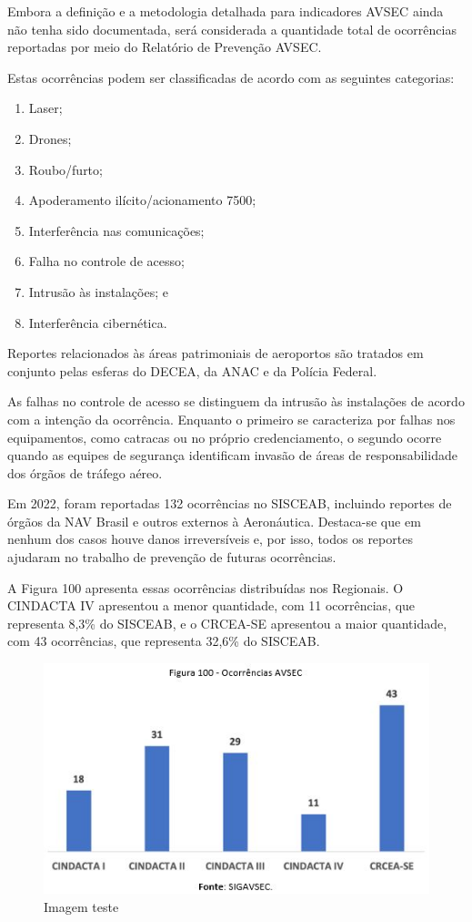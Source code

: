 \documentclass[
]{book}
\begin{document}
Embora a definição e a metodologia detalhada para indicadores AVSEC ainda não tenha sido documentada, será considerada a quantidade total de ocorrências reportadas por meio do Relatório de Prevenção AVSEC.

Estas ocorrências podem ser classificadas de acordo com as seguintes categorias:

\begin{enumerate}
\def\labelenumi{\alph{enumi})}
\item
  Laser;
\item
  Drones;
\item
  Roubo/furto;
\item
  Apoderamento ilícito/acionamento 7500;
\item
  Interferência nas comunicações;
\item
  Falha no controle de acesso;
\item
  Intrusão às instalações; e
\item
  Interferência cibernética.
\end{enumerate}

Reportes relacionados às áreas patrimoniais de aeroportos são tratados em conjunto pelas esferas do DECEA, da ANAC e da Polícia Federal.

As falhas no controle de acesso se distinguem da intrusão às instalações de acordo com a intenção da ocorrência. Enquanto o primeiro se caracteriza por falhas nos equipamentos, como catracas ou no próprio credenciamento, o segundo ocorre quando as equipes de segurança identificam invasão de áreas de responsabilidade dos órgãos de tráfego aéreo.

Em 2022, foram reportadas 132 ocorrências no SISCEAB, incluindo reportes de órgãos da NAV Brasil e outros externos à Aeronáutica. Destaca-se que em nenhum dos casos houve danos irreversíveis e, por isso, todos os reportes ajudaram no trabalho de prevenção de futuras ocorrências.

A Figura 100 apresenta essas ocorrências distribuídas nos Regionais. O CINDACTA IV apresentou a menor quantidade, com 11 ocorrências, que representa 8,3\% do SISCEAB, e o CRCEA-SE apresentou a maior quantidade, com 43 ocorrências, que representa 32,6\% do SISCEAB.

\begin{figure}
\centering
\includegraphics{imagens/fig87.jpg}
\caption{Imagem teste}
\end{figure}
\end{document}
